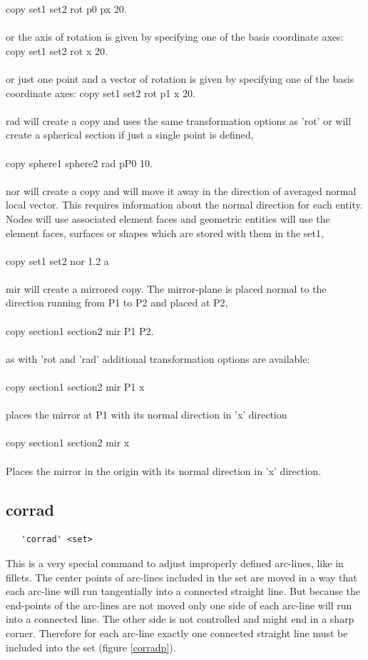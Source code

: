 \documentclass{article}
\begin{document}
copy set1 set2 rot p0 px 20.\\\\
or the axis of rotation is given by specifying one of the basis coordinate axes:
copy set1 set2 rot x 20.\\\\
or just one point and a vector of rotation is given by specifying one of the basis coordinate axes:
copy set1 set2 rot p1 x 20.\\\\
rad will create a copy and uses the same transformation options as 'rot' or will create a spherical section if just a single point is defined,\\\\
copy sphere1 sphere2 rad pP0 10.\\\\
nor will create a copy and will move it away in the direction of averaged normal local vector. This requires information about the normal direction for each entity. Nodes will use associated element faces and geometric entities will use the element faces, surfaces or shapes which are stored with them in the set1,\\\\
copy set1 set2 nor 1.2 a\\\\
mir will create a mirrored copy. The mirror-plane is placed normal to the direction running from P1 to P2 and placed at P2,\\\\
copy section1 section2 mir P1 P2.\\\\
as with 'rot and 'rad' additional transformation options are available:\\\\
copy section1 section2 mir P1 x\\\\
places the mirror at P1 with its normal direction in 'x' direction\\\\
copy section1 section2 mir x\\\\
Places the mirror in the origin with its normal direction in 'x' direction.

\subsection{\label{corrad}corrad}
\begin{verbatim}
   'corrad' <set>
\end{verbatim}
This is a very special command to adjust improperly defined arc-lines, like in fillets. The center points of arc-lines included in the set are moved in a way that each arc-line will run tangentially into a connected straight line. But because the end-points of the arc-lines are not moved only one side of each arc-line will run into a connected line. The other side is not controlled and might end in a sharp corner. Therefore for each arc-line exactly one connected straight line must be included into the set (figure \ref{corradp}).
\end{document}

